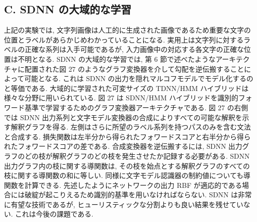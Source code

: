 \documentclass[twocolumn]{jarticle}     %
\begin{document}
\subsection*{C. SDNN の大域的な学習}
上記の実験では, 文字列画像は人工的に生成された画像であるため重要な文字の位置とラベルがあらかじめわかっていることになる. 実用上は文字列に対するラベルの正確な系列は入手可能であるが, 入力画像中の対応する各文字の正確な位置は不明となる. SDNN の大域的な学習では, 第 6 節で述べたようなアーキテクチャに配置された図 27 のようなグラフ変換器を介して勾配を逆伝搬することによって可能となる. 
これは SDNN の出力を隠れマルコフモデルでモデル化するのと等価である. 大域的に学習された可変サイズの TDNN/HMM ハイブリッドは様々な分野に用いられている. 
図 27 は SDNN/HMM ハイブリッドを識別的フォワード基準で学習するためのグラフ変換器アーキテクチャである. 
図 27 の右側では SDNN 出力系列と文字モデル変換器の合成によりすべての可能な解釈を示す解釈グラフを得る. 左側はさらに所望のラベル系列を持つパスのみを含む文法と合成する. 損失関数は左半分から得られたフォワードスコアと右半分から得られたフォワードスコアの差である. 
合成変換器を逆伝搬するには, SDNN 出力グラフのどの枝が解釈グラフのどの枝を発生させたか記録する必要がある. SDNN 出力グラフ内の枝に関する導関数は, その枝を始点とする解釈グラフのすべての枝に関する導関数の和に等しい. 同様に文字モデル認識器の制約値についても導関数を計算できる. 先述したようにネットワークの出力 RBF が適応的である場合には破綻が起こりえるため識別的基準を用いなければならない. 
SDNN は非常に有望な技術であるが, ヒューリスティックな分割よりも良い結果を残せていない. これは今後の課題である.
\end{document}
